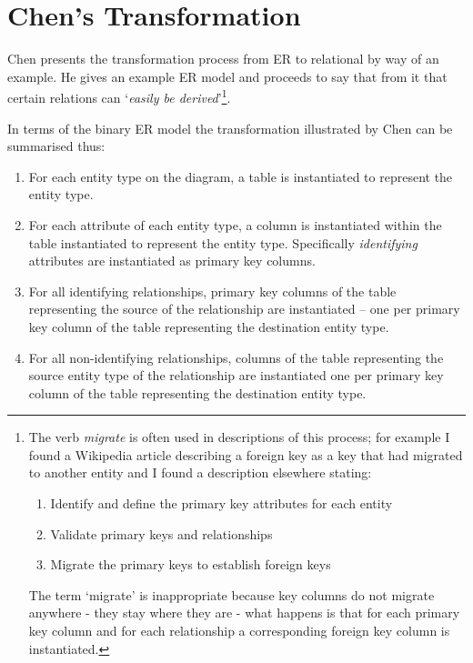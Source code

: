 \documentclass[10pt,a4paper]{article}
\begin{document}
\section{Chen's Transformation}
\label{ChensTransformation}

Chen presents the transformation process from ER to relational by way of an example. 
He gives an example ER model and proceeds to say that from it that certain relations can `\textit{easily be derived}'\footnote{The verb \textit{migrate} is often used in descriptions of this process; for example I found a Wikipedia article describing a foreign key as a key that had migrated to another entity and I found a description elsewhere stating:
\begin{enumerate}
\item {Identify and define the primary key attributes for each entity}
\item {Validate primary keys and relationships}
\item {Migrate the primary keys to establish foreign keys}
\end{enumerate} The term `migrate' is inappropriate because key columns do not migrate anywhere - they stay where they are - what happens is that for each primary key column and for each relationship a corresponding foreign key column is instantiated.
}. 

In terms of the binary ER model the transformation illustrated by Chen can be summarised thus:
\begin{enumerate} [I]
	\item For each entity type on the diagram, a table is instantiated to represent the entity type.
  \item For each attribute of each entity type, a column is instantiated within the table
	      instantiated to represent the entity type. Specifically \textit{identifying}
				attributes are instantiated as primary key columns.
  \item For all identifying relationships,
	      primary key columns of the table representing the source of the relationship
				are instantiated --
				one per primary key column of the table representing the destination entity type.
  \item For all non-identifying relationships, columns of the table representing the
	      source entity type of the
	      relationship are instantiated one per primary key column of the 
				table representing the destination entity type.
\end{enumerate}
\end{document}
